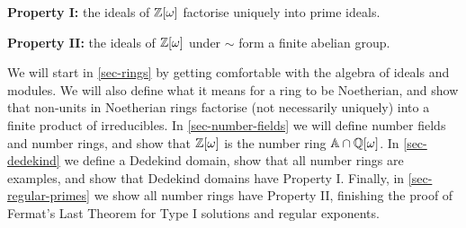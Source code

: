 \textbf{Property I:} the ideals of $\mathbb{Z}[\omega]$ factorise uniquely into prime ideals.

\textbf{Property II:} the ideals of $\mathbb{Z}[\omega]$ under $\sim$ form a finite abelian group.

We will start in \cref{sec-rings} by getting comfortable with the algebra of ideals and modules. We will also define what it means for a ring to be Noetherian, and show that non-units in Noetherian rings factorise (not necessarily uniquely) into a finite product of irreducibles. In \cref{sec-number-fields} we will define number fields and number rings, and show that $\mathbb{Z}[\omega]$ is the number ring $\mathbb{A} \cap\mathbb{Q}[\omega]$. In \cref{sec-dedekind} we define a Dedekind domain, show that all number rings are examples, and show that Dedekind domains have Property I. Finally, in \cref{sec-regular-primes}  we show all number rings have Property II, finishing the proof of Fermat's Last Theorem for Type I solutions and regular exponents.